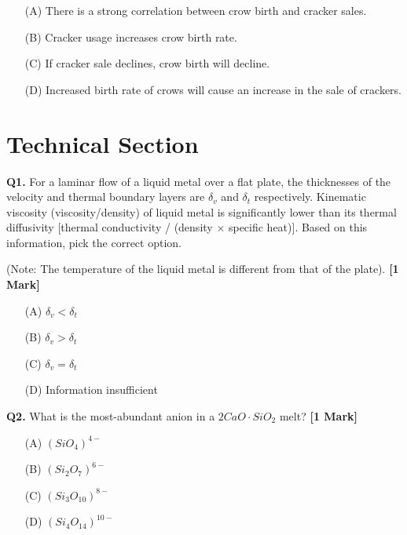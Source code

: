 \documentclass[11pt]{article}
\newcommand{\questiona}[2]{
    \noindent\textbf{Q#2.} #1 \hfill \textbf{[1 Mark]}
}
\begin{document}
\begin{enumerate}
    \item[(A)] There is a strong correlation between crow birth and cracker sales.  
    \item[(B)] Cracker usage increases crow birth rate.  
    \item[(C)] If cracker sale declines, crow birth will decline.  
    \item[(D)] Increased birth rate of crows will cause an increase in the sale of crackers.  
\end{enumerate}
\vspace{0.5cm}

\section*{Technical Section}

\questiona{For a laminar flow of a liquid metal over a flat plate, the thicknesses of the velocity and thermal boundary layers are \(\delta_v\) and \(\delta_t\) respectively. Kinematic viscosity (viscosity/density) of liquid metal is significantly lower than its thermal diffusivity [thermal conductivity / (density × specific heat)]. Based on this information, pick the correct option. 

(Note: The temperature of the liquid metal is different from that of the plate).}{1}
\begin{enumerate}
    \item[(A)] \(\delta_v < \delta_t\)  
    \item[(B)] \(\delta_v > \delta_t\)  
    \item[(C)] \(\delta_v = \delta_t\)  
    \item[(D)] Information insufficient  
\end{enumerate}
\vspace{0.5cm}

\questiona{What is the most-abundant anion in a \(2CaO \cdot SiO_2\) melt?}{2}
\begin{enumerate}
    \item[(A)] \((SiO_4)^{4-}\)  
    \item[(B)] \((Si_2O_7)^{6-}\)  
    \item[(C)] \((Si_3O_{10})^{8-}\)  
    \item[(D)] \((Si_4O_{14})^{10-}\)  
\end{enumerate}
\vspace{0.5cm}
\end{document}
